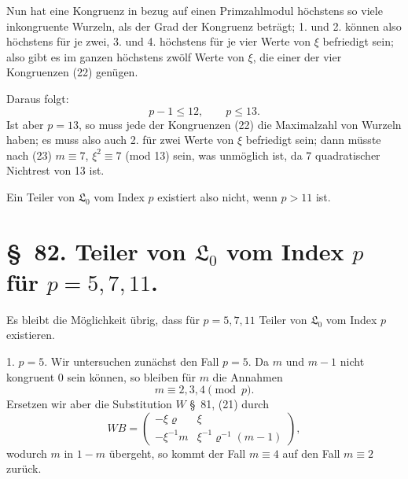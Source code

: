 \documentclass[11pt]{article}
\providecommand{\Lzero}{\mathfrak L_0}
\begin{document}
Nun hat eine Kongruenz in bezug auf einen Primzahlmodul höchstens so viele inkongruente Wurzeln, als der Grad der Kongruenz beträgt; 1. und 2. können also höchstens für je zwei, 3. und 4. höchstens für je vier Werte von $\xi$ befriedigt sein; also gibt es im ganzen höchstens zwölf Werte von $\xi$, die einer der vier Kongruenzen (22) genügen.

Daraus folgt:
\[
 p-1\leq12,\qquad p\leq13.
\]
Ist aber $p=13$, so muss jede der Kongruenzen (22) die Maximalzahl von Wurzeln haben; es muss also auch 2. für zwei Werte von $\xi$ befriedigt sein; dann müsste nach (23) $m\equiv7$, $\xi^2\equiv7$ (mod 13) sein, was unmöglich ist, da $7$ quadratischer Nichtrest von 13 ist.

Ein Teiler von $\Lzero$ vom Index $p$ existiert also nicht, wenn $p>11$ ist.

\section*{\S~82. Teiler von $\Lzero$ vom Index $p$ für $p=5,7,11$.}

Es bleibt die Möglichkeit übrig, dass für $p=5,7,11$ Teiler von $\Lzero$ vom Index $p$ existieren.

1. $p=5$. Wir untersuchen zunächst den Fall $p=5$. Da $m$ und $m-1$ nicht kongruent $0$ sein können, so bleiben für $m$ die Annahmen
\[
 m\equiv2,3,4\pmod p.
\]
Ersetzen wir aber die Substitution $W$ \S~81, (21) durch
\begin{equation}
 WB=\begin{pmatrix}
 -\xi\varrho & \xi\\
 -\xi^{-1}m & \xi^{-1}\varrho^{-1}(m-1)
 \end{pmatrix},
\tag{1}
\end{equation}
wodurch $m$ in $1-m$ übergeht, so kommt der Fall $m\equiv4$ auf den Fall $m\equiv2$ zurück.
\end{document}
